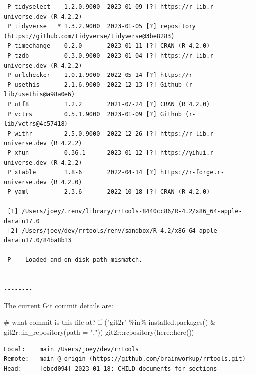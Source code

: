 \documentclass[
  super,
  preprint,
  3p]{elsarticle}
\newenvironment{Shaded}{\begin{snugshade}}{\end{snugshade}}
\newcommand{\AttributeTok}[1]{\textcolor[rgb]{0.40,0.45,0.13}{#1}}
\newcommand{\CommentTok}[1]{\textcolor[rgb]{0.37,0.37,0.37}{#1}}
\newcommand{\ControlFlowTok}[1]{\textcolor[rgb]{0.00,0.23,0.31}{#1}}
\newcommand{\FunctionTok}[1]{\textcolor[rgb]{0.28,0.35,0.67}{#1}}
\newcommand{\NormalTok}[1]{\textcolor[rgb]{0.00,0.23,0.31}{#1}}
\newcommand{\SpecialCharTok}[1]{\textcolor[rgb]{0.37,0.37,0.37}{#1}}
\newcommand{\StringTok}[1]{\textcolor[rgb]{0.13,0.47,0.30}{#1}}
\begin{document}
\begin{verbatim}
 P tidyselect    1.2.0.9000  2023-01-09 [?] https://r-lib.r-universe.dev (R 4.2.2)
 P tidyverse   * 1.3.2.9000  2023-01-05 [?] repository (https://github.com/tidyverse/tidyverse@3be8283)
 P timechange    0.2.0       2023-01-11 [?] CRAN (R 4.2.0)
 P tzdb          0.3.0.9000  2023-01-04 [?] https://r-lib.r-universe.dev (R 4.2.2)
 P urlchecker    1.0.1.9000  2022-05-14 [?] https://r~
 P usethis       2.1.6.9000  2022-12-13 [?] Github (r-lib/usethis@a98a0e6)
 P utf8          1.2.2       2021-07-24 [?] CRAN (R 4.2.0)
 P vctrs         0.5.1.9000  2023-01-09 [?] Github (r-lib/vctrs@4c57418)
 P withr         2.5.0.9000  2022-12-26 [?] https://r-lib.r-universe.dev (R 4.2.2)
 P xfun          0.36.1      2023-01-12 [?] https://yihui.r-universe.dev (R 4.2.2)
 P xtable        1.8-6       2022-04-14 [?] https://r-forge.r-universe.dev (R 4.2.0)
 P yaml          2.3.6       2022-10-18 [?] CRAN (R 4.2.0)

 [1] /Users/joey/.renv/library/rrtools-8440cc86/R-4.2/x86_64-apple-darwin17.0
 [2] /Users/joey/dev/rrtools/renv/sandbox/R-4.2/x86_64-apple-darwin17.0/84ba8b13

 P -- Loaded and on-disk path mismatch.

------------------------------------------------------------------------------
\end{verbatim}

The current Git commit details are:

\begin{Shaded}
\begin{Highlighting}[]
\CommentTok{\# what commit is this file at? }
\ControlFlowTok{if}\NormalTok{ (}\StringTok{"git2r"} \SpecialCharTok{\%in\%} \FunctionTok{installed.packages}\NormalTok{() }\SpecialCharTok{\&}\NormalTok{ git2r}\SpecialCharTok{::}\FunctionTok{in\_repository}\NormalTok{(}\AttributeTok{path =} \StringTok{"."}\NormalTok{)) git2r}\SpecialCharTok{::}\FunctionTok{repository}\NormalTok{(here}\SpecialCharTok{::}\FunctionTok{here}\NormalTok{())  }
\end{Highlighting}
\end{Shaded}

\begin{verbatim}
Local:    main /Users/joey/dev/rrtools
Remote:   main @ origin (https://github.com/brainworkup/rrtools.git)
Head:     [ebcd094] 2023-01-18: CHILD documents for sections
\end{verbatim}


  
\end{document}
